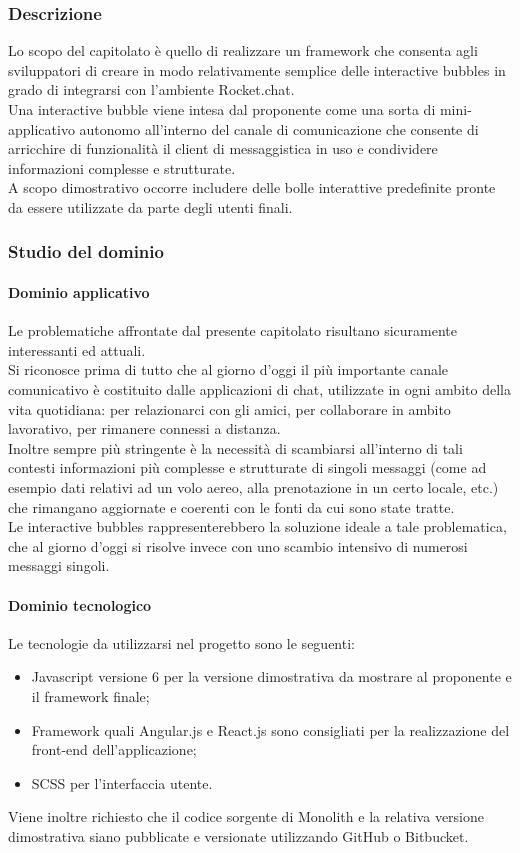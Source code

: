 		\subsubsection{Descrizione}
		Lo scopo del capitolato è quello di realizzare un framework che consenta agli sviluppatori di creare in modo relativamente semplice delle 
		interactive bubbles in grado di integrarsi con l'ambiente Rocket.chat.
		\\Una interactive bubble viene intesa dal proponente come una sorta di mini-applicativo autonomo all'interno del canale di comunicazione 
		che consente di arricchire di funzionalità il client di messaggistica in uso e condividere informazioni complesse e strutturate. 
		\\A scopo dimostrativo occorre includere delle bolle interattive predefinite pronte da essere utilizzate da parte degli utenti finali.
		
		\subsubsection{Studio del dominio}
			\paragraph{Dominio applicativo}
			Le problematiche affrontate dal presente capitolato risultano sicuramente interessanti ed attuali.
			\\Si riconosce prima di tutto che al giorno d'oggi il più importante canale comunicativo è costituito dalle applicazioni di chat, 
			utilizzate in ogni ambito della vita quotidiana: per relazionarci con gli amici, per collaborare in ambito lavorativo, per rimanere 
			connessi a distanza.
			\\Inoltre sempre più stringente è la necessità di scambiarsi all'interno di tali contesti informazioni più complesse e strutturate di singoli messaggi 
			(come ad esempio dati relativi ad un volo aereo, alla prenotazione in un certo locale, etc.) che rimangano aggiornate e coerenti con 
			le fonti da cui sono state tratte.
			\\Le interactive bubbles rappresenterebbero la soluzione ideale a tale problematica, che al giorno d'oggi si risolve invece con uno 
			scambio intensivo di numerosi messaggi singoli. 
			\paragraph{Dominio tecnologico}
			Le tecnologie da utilizzarsi nel progetto sono le seguenti:
			\begin{itemize}
				\item Javascript versione 6 per la versione dimostrativa da mostrare al proponente e il framework finale;
				\item Framework quali Angular.js e React.js sono consigliati per la realizzazione del front-end dell'applicazione;
				\item SCSS per l'interfaccia utente.
			\end{itemize}
			Viene inoltre richiesto che il codice sorgente di Monolith e la relativa versione dimostrativa siano pubblicate e versionate utilizzando 
			GitHub o Bitbucket.
